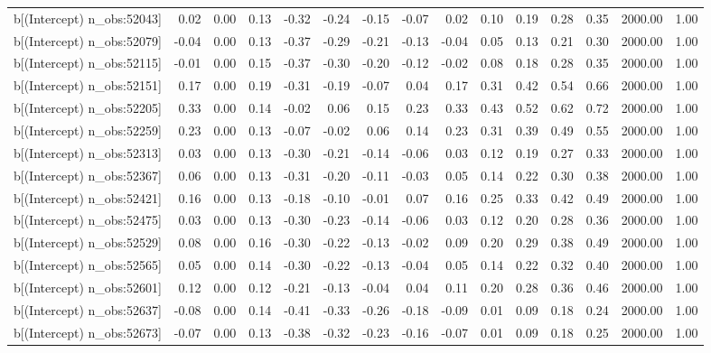 \begin{table}[ht]
\begin{tabular}{rrrrrrrrrrrrrrr}
  b[(Intercept) n\_obs:52043] & 0.02 & 0.00 & 0.13 & -0.32 & -0.24 & -0.15 & -0.07 & 0.02 & 0.10 & 0.19 & 0.28 & 0.35 & 2000.00 & 1.00 \\ 
  b[(Intercept) n\_obs:52079] & -0.04 & 0.00 & 0.13 & -0.37 & -0.29 & -0.21 & -0.13 & -0.04 & 0.05 & 0.13 & 0.21 & 0.30 & 2000.00 & 1.00 \\ 
  b[(Intercept) n\_obs:52115] & -0.01 & 0.00 & 0.15 & -0.37 & -0.30 & -0.20 & -0.12 & -0.02 & 0.08 & 0.18 & 0.28 & 0.35 & 2000.00 & 1.00 \\ 
  b[(Intercept) n\_obs:52151] & 0.17 & 0.00 & 0.19 & -0.31 & -0.19 & -0.07 & 0.04 & 0.17 & 0.31 & 0.42 & 0.54 & 0.66 & 2000.00 & 1.00 \\ 
  b[(Intercept) n\_obs:52205] & 0.33 & 0.00 & 0.14 & -0.02 & 0.06 & 0.15 & 0.23 & 0.33 & 0.43 & 0.52 & 0.62 & 0.72 & 2000.00 & 1.00 \\ 
  b[(Intercept) n\_obs:52259] & 0.23 & 0.00 & 0.13 & -0.07 & -0.02 & 0.06 & 0.14 & 0.23 & 0.31 & 0.39 & 0.49 & 0.55 & 2000.00 & 1.00 \\ 
  b[(Intercept) n\_obs:52313] & 0.03 & 0.00 & 0.13 & -0.30 & -0.21 & -0.14 & -0.06 & 0.03 & 0.12 & 0.19 & 0.27 & 0.33 & 2000.00 & 1.00 \\ 
  b[(Intercept) n\_obs:52367] & 0.06 & 0.00 & 0.13 & -0.31 & -0.20 & -0.11 & -0.03 & 0.05 & 0.14 & 0.22 & 0.30 & 0.38 & 2000.00 & 1.00 \\ 
  b[(Intercept) n\_obs:52421] & 0.16 & 0.00 & 0.13 & -0.18 & -0.10 & -0.01 & 0.07 & 0.16 & 0.25 & 0.33 & 0.42 & 0.49 & 2000.00 & 1.00 \\ 
  b[(Intercept) n\_obs:52475] & 0.03 & 0.00 & 0.13 & -0.30 & -0.23 & -0.14 & -0.06 & 0.03 & 0.12 & 0.20 & 0.28 & 0.36 & 2000.00 & 1.00 \\ 
  b[(Intercept) n\_obs:52529] & 0.08 & 0.00 & 0.16 & -0.30 & -0.22 & -0.13 & -0.02 & 0.09 & 0.20 & 0.29 & 0.38 & 0.49 & 2000.00 & 1.00 \\ 
  b[(Intercept) n\_obs:52565] & 0.05 & 0.00 & 0.14 & -0.30 & -0.22 & -0.13 & -0.04 & 0.05 & 0.14 & 0.22 & 0.32 & 0.40 & 2000.00 & 1.00 \\ 
  b[(Intercept) n\_obs:52601] & 0.12 & 0.00 & 0.12 & -0.21 & -0.13 & -0.04 & 0.04 & 0.11 & 0.20 & 0.28 & 0.36 & 0.46 & 2000.00 & 1.00 \\ 
  b[(Intercept) n\_obs:52637] & -0.08 & 0.00 & 0.14 & -0.41 & -0.33 & -0.26 & -0.18 & -0.09 & 0.01 & 0.09 & 0.18 & 0.24 & 2000.00 & 1.00 \\ 
  b[(Intercept) n\_obs:52673] & -0.07 & 0.00 & 0.13 & -0.38 & -0.32 & -0.23 & -0.16 & -0.07 & 0.01 & 0.09 & 0.18 & 0.25 & 2000.00 & 1.00 \\ 

\end{tabular}
\end{table}
